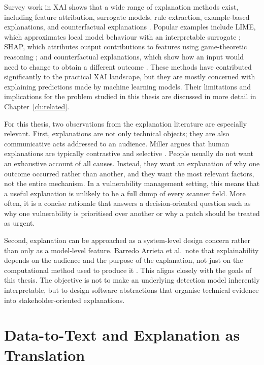 Survey work in XAI shows that a wide range of explanation methods exist, including feature attribution, surrogate models, rule extraction, example-based explanations, and counterfactual explanations \cite{guidotti2018survey, barredo2020xai}. Popular examples include LIME, which approximates local model behaviour with an interpretable surrogate \cite{ribeiro2016should}; SHAP, which attributes output contributions to features using game-theoretic reasoning \cite{lundberg2017unified}; and counterfactual explanations, which show how an input would need to change to obtain a different outcome \cite{wachter2017counterfactual}. These methods have contributed significantly to the practical XAI landscape, but they are mostly concerned with explaining predictions made by machine learning models. Their limitations and implications for the problem studied in this thesis are discussed in more detail in Chapter~\ref{ch:related}.

For this thesis, two observations from the explanation literature are especially relevant. First, explanations are not only technical objects; they are also communicative acts addressed to an audience. Miller argues that human explanations are typically contrastive and selective \cite{miller2019explanation}. People usually do not want an exhaustive account of all causes. Instead, they want an explanation of why one outcome occurred rather than another, and they want the most relevant factors, not the entire mechanism. In a vulnerability management setting, this means that a useful explanation is unlikely to be a full dump of every scanner field. More often, it is a concise rationale that answers a decision-oriented question such as why one vulnerability is prioritised over another or why a patch should be treated as urgent.

Second, explanation can be approached as a system-level design concern rather than only as a model-level feature. Barredo Arrieta et al.\ note that explainability depends on the audience and the purpose of the explanation, not just on the computational method used to produce it \cite{barredo2020xai}. This aligns closely with the goals of this thesis. The objective is not to make an underlying detection model inherently interpretable, but to design software abstractions that organise technical evidence into stakeholder-oriented explanations.

\section{Data-to-Text and Explanation as Translation}

